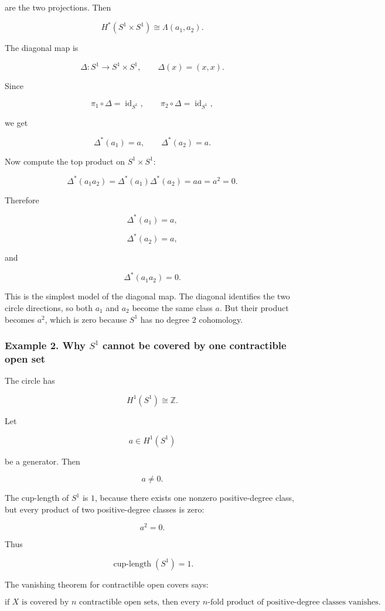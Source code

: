 \documentclass[12pt,a4paper]{article}
\theoremstyle{notespace}
\begin{document}
are the two projections. Then

\[
H^*(S^1\times S^1)
\cong
\Lambda(a_1,a_2).
\]

The diagonal map is

\[
\Delta:S^1\to S^1\times S^1,
\qquad
\Delta(x)=(x,x).
\]

Since

\[
\pi_1\circ \Delta=\operatorname{id}_{S^1},
\qquad
\pi_2\circ \Delta=\operatorname{id}_{S^1},
\]

we get

\[
\Delta^*(a_1)=a,
\qquad
\Delta^*(a_2)=a.
\]

Now compute the top product on \(S^1\times S^1\):

\[
\Delta^*(a_1a_2)
=
\Delta^*(a_1)\Delta^*(a_2)
=
aa
=
a^2
=
0.
\]

Therefore

\[
\boxed{
	\Delta^*(a_1)=a,
}
\]

\[
\boxed{
	\Delta^*(a_2)=a,
}
\]

and

\[
\boxed{
	\Delta^*(a_1a_2)=0.
}
\]

This is the simplest model of the diagonal map. The diagonal identifies the two circle directions, so both \(a_1\) and \(a_2\) become the same class \(a\). But their product becomes \(a^2\), which is zero because \(S^1\) has no degree \(2\) cohomology.

\subsubsection{Example 2. Why \(S^1\) cannot be covered by one contractible open set}

The circle has

\[
H^1(S^1)\cong \mathbb Z.
\]

Let

\[
a\in H^1(S^1)
\]

be a generator. Then

\[
a\neq 0.
\]

The cup-length of \(S^1\) is \(1\), because there exists one nonzero positive-degree class, but every product of two positive-degree classes is zero:

\[
a^2=0.
\]

Thus

\[
\operatorname{cup\text{-}length}(S^1)=1.
\]

The vanishing theorem for contractible open covers says:

\[
\text{if }X\text{ is covered by }n\text{ contractible open sets, then every }n\text{-fold product of positive-degree classes vanishes.}
\]
\end{document}
